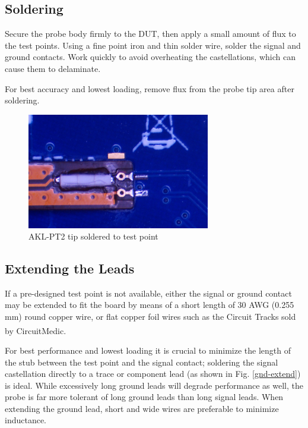 \documentclass[11pt]{article}
\newcommand{\rtm}{\textsuperscript{\textregistered\space}}
\begin{document}
\subsection{Soldering}

Secure the probe body firmly to the DUT, then apply a small amount of flux to the test points. Using a fine point iron
and thin solder wire, solder the signal and ground contacts. Work quickly to avoid overheating the castellations, which
can cause them to delaminate.

For best accuracy and lowest loading, remove flux from the probe tip area after soldering.

\begin{figure}[h]
\centering
\includegraphics[width=8cm]{tip-on-testpoint.jpg}
\caption{AKL-PT2 tip soldered to test point}
\label{tip-on-testpoint}
\end{figure}
\FloatBarrier

\subsection{Extending the Leads}

If a pre-designed test point is not available, either the signal or ground contact may be extended to fit the board by
means of a short length of 30 AWG (0.255 mm) round copper wire, or flat copper foil wires such as the Circuit Tracks
sold by CircuitMedic\rtm.

For best performance and lowest loading it is crucial to minimize the length of the stub between the test point and the
signal contact; soldering the signal castellation directly to a trace or component lead (as shown in Fig.
\ref{gnd-extend}) is ideal. While excessively long ground leads will degrade performance as well, the probe is far more
tolerant of long ground leads than long signal leads. When extending the ground lead, short and wide wires are
preferable to minimize inductance.
\end{document}
